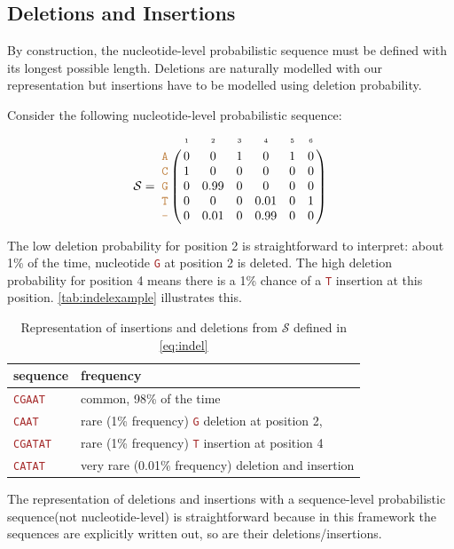 \documentclass[
]{article}
\newcommand{\sq}[1]{\texttt{\textcolor{brown}{#1}}}
\newcommand{\nps}{\mathcal{S}} %
\newcommand{\nlps}{nucleotide-level probabilistic sequence\xspace}
\newcommand{\slps}{sequence-level probabilistic sequence\xspace}
\begin{document}
\hypertarget{deletions-and-insertions}{%
\subsection{Deletions and Insertions}\label{deletions-and-insertions}}

By construction, the \nlps must be defined with its longest possible
length. Deletions are naturally modelled with our representation but
insertions have to be modelled using deletion probability.

Consider the following \nlps: \begin{equation}
\label{eq:indel}
\nps = 
\bordermatrix{
&\scriptscriptstyle{1} & \scriptscriptstyle{2}& \scriptscriptstyle{3}& \scriptscriptstyle{4} & \scriptscriptstyle{5} & \scriptscriptstyle{6} \cr
\sq{A} & 0 & 0   & 1 & 0    & 1 & 0\cr
\sq{C} & 1 & 0    & 0 & 0    & 0 & 0\cr
\sq{G} & 0 & 0.99 & 0 & 0    & 0 & 0\cr
\sq{T} & 0 & 0    & 0 & 0.01 & 0 & 1\cr
\sq{-} & 0 & 0.01 & 0 & 0.99 & 0 & 0\cr
}
\end{equation}

The low deletion probability for position 2 is straightforward to
interpret: about 1\% of the time, nucleotide \sq{G} at position 2 is
deleted. The high deletion probability for position 4 means there is a
1\% chance of a \sq{T} insertion at this position.
\autoref{tab:indelexample} illustrates this.

\begin{table}[H]
\caption{Representation of insertions and deletions from $\nps$ defined in \eqref{eq:indel}}
\begin{center}
\label{tab:indelexample}
\begin{tabular}{ll}
\hline
\textbf{sequence} & \textbf{frequency} \\
\hline
\sq{CGAAT}  & common, 98\% of the time \\
\sq{CAAT}   & rare (1\% frequency) \sq{G} deletion at position 2,  \\
\sq{CGATAT} & rare (1\% frequency) \sq{T} insertion at position 4 \\
\sq{CATAT} & very rare (0.01\% frequency) deletion and insertion  \\
\hline
\end{tabular}
\end{center}
\end{table}

The representation of deletions and insertions with a \slps (not
nucleotide-level) is straightforward because in this framework the
sequences are explicitly written out, so are their deletions/insertions.
\end{document}

